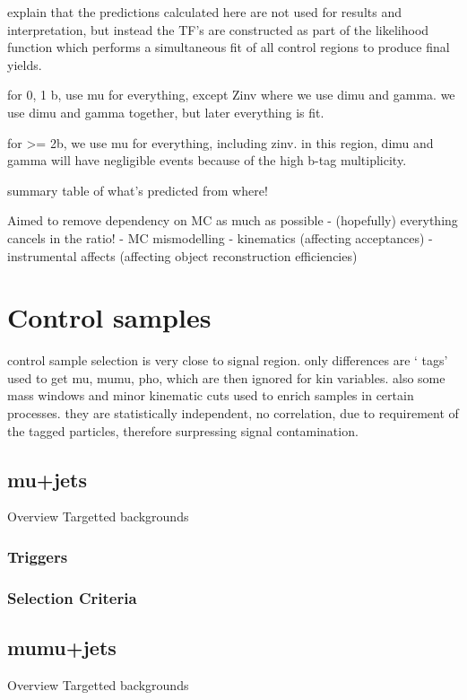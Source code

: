 explain that the predictions calculated here are not used for results and 
interpretation, but instead the TF's are constructed as part of the likelihood 
function which performs a simultaneous fit of all control regions to produce 
final yields.

for 0, 1 b, use mu for everything, except Zinv where we use dimu and gamma.
we use dimu and gamma together, but later everything is fit.

for >= 2b, we use mu for everything, including zinv. in this region, dimu and 
gamma will have negligible events because of the high b-tag multiplicity.

summary table of what's predicted from where!

Aimed to remove dependency on MC as much as possible - (hopefully) everything cancels in 
the ratio!
- MC mismodelling
    - kinematics (affecting acceptances)
    - instrumental affects (affecting object reconstruction efficiencies)


\section{Control samples}  %
\label{sec:background_control}

control sample selection is very close to signal region. only differences are `
tags' used to get mu, mumu, pho, which are then ignored for kin variables. also
some mass windows  and minor kinematic cuts used to enrich samples in certain
processes. they are statistically independent, no correlation, due to 
requirement of the tagged particles, therefore surpressing signal contamination.

\subsection{mu+jets}
Overview
Targetted backgrounds
\subsubsection{Triggers}
\subsubsection{Selection Criteria}

\subsection{mumu+jets}
Overview
Targetted backgrounds
